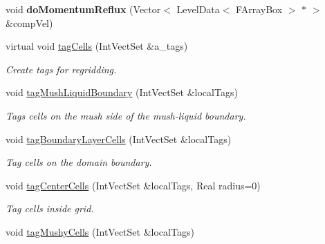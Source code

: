 \begin{DoxyCompactItemize}
\item 
\hypertarget{class_a_m_r_level_mushy_layer_a74d98dd94e04f4732f7ac6b71e7b484c}{void {\bfseries do\-Momentum\-Reflux} (Vector$<$ Level\-Data$<$ F\-Array\-Box $>$ $\ast$ $>$ \&comp\-Vel)}\label{class_a_m_r_level_mushy_layer_a74d98dd94e04f4732f7ac6b71e7b484c}

\item 
\hypertarget{class_a_m_r_level_mushy_layer_aff274f3682a706271fc3a26eefb0be20}{virtual void \hyperlink{class_a_m_r_level_mushy_layer_aff274f3682a706271fc3a26eefb0be20}{tag\-Cells} (Int\-Vect\-Set \&a\-\_\-tags)}\label{class_a_m_r_level_mushy_layer_aff274f3682a706271fc3a26eefb0be20}

\begin{DoxyCompactList}\small\item\em Create tags for regridding. \end{DoxyCompactList}\item 
\hypertarget{class_a_m_r_level_mushy_layer_a3bfdf4f5d7260b8f6f834777ce8a7650}{void \hyperlink{class_a_m_r_level_mushy_layer_a3bfdf4f5d7260b8f6f834777ce8a7650}{tag\-Mush\-Liquid\-Boundary} (Int\-Vect\-Set \&local\-Tags)}\label{class_a_m_r_level_mushy_layer_a3bfdf4f5d7260b8f6f834777ce8a7650}

\begin{DoxyCompactList}\small\item\em Tags cells on the mush side of the mush-\/liquid boundary. \end{DoxyCompactList}\item 
\hypertarget{class_a_m_r_level_mushy_layer_a4581ecc244c826a19c696e5b8d01abf3}{void \hyperlink{class_a_m_r_level_mushy_layer_a4581ecc244c826a19c696e5b8d01abf3}{tag\-Boundary\-Layer\-Cells} (Int\-Vect\-Set \&local\-Tags)}\label{class_a_m_r_level_mushy_layer_a4581ecc244c826a19c696e5b8d01abf3}

\begin{DoxyCompactList}\small\item\em Tag cells on the domain boundary. \end{DoxyCompactList}\item 
\hypertarget{class_a_m_r_level_mushy_layer_a6eee1db20d8b07c958a1e19af1dbbe4a}{void \hyperlink{class_a_m_r_level_mushy_layer_a6eee1db20d8b07c958a1e19af1dbbe4a}{tag\-Center\-Cells} (Int\-Vect\-Set \&local\-Tags, Real radius=0)}\label{class_a_m_r_level_mushy_layer_a6eee1db20d8b07c958a1e19af1dbbe4a}

\begin{DoxyCompactList}\small\item\em Tag cells inside grid. \end{DoxyCompactList}\item 
\hypertarget{class_a_m_r_level_mushy_layer_a921f860820c88cc804345a20c2bd596d}{void \hyperlink{class_a_m_r_level_mushy_layer_a921f860820c88cc804345a20c2bd596d}{tag\-Mushy\-Cells} (Int\-Vect\-Set \&local\-Tags)}\label{class_a_m_r_level_mushy_layer_a921f860820c88cc804345a20c2bd596d}


\end{DoxyCompactItemize}
